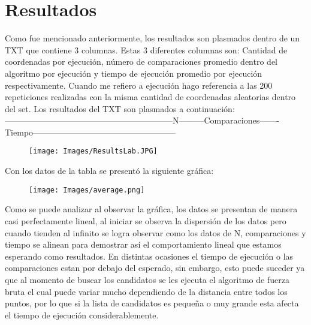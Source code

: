 \section{Resultados}
Como fue mencionado anteriormente, los resultados son plasmados dentro de un TXT que contiene 3 columnas. Estas 3 diferentes columnas son: Cantidad de coordenadas por ejecución, número de comparaciones promedio dentro del algoritmo por ejecución y tiempo de ejecución promedio por ejecución respectivamente. Cuando me refiero a ejecución hago referencia a las 200 repeticiones realizadas con la misma cantidad de coordenadas aleatorias dentro del set. Los resultados del TXT son plasmados a continuación: \\
------------------------------------------------------------N---------Comparaciones-------Tiempo---------------------------------------------------

\begin{figure}[h!]
	\centering
	\texttt{[image: Images/ResultsLab.JPG]}
\end{figure}

Con los datos de la tabla se presentó la siguiente gráfica:\\

\begin{figure}[h!]
	\centering
	\texttt{[image: Images/average.png]}
\end{figure}

Como se puede analizar al observar la gráfica, los datos se presentan de manera casi perfectamente lineal, al iniciar se observa la dispersión de los datos pero cuando tienden al infinito se logra observar como los datos de N, comparaciones y tiempo se alinean para demostrar así el comportamiento lineal que estamos esperando como resultados. En distintas ocasiones el tiempo de ejecución o las comparaciones estan por debajo del esperado, sin embargo, esto puede suceder ya que al momento de buscar los candidatos se les ejecuta el algoritmo de fuerza bruta el cual puede variar mucho dependiendo de la distancia entre todos los puntos, por lo que si la lista de candidatos es pequeña o muy grande esta afecta el tiempo de ejecución considerablemente. 

